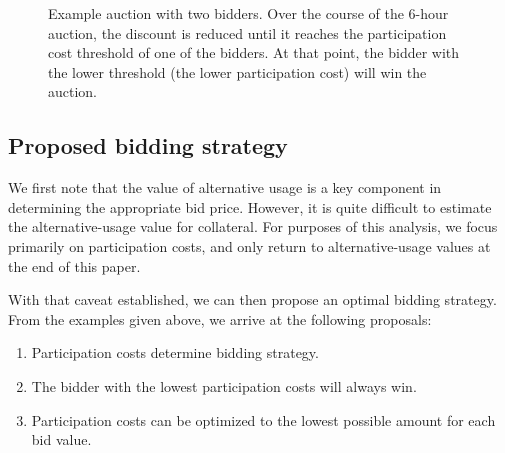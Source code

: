 \documentclass[conference]{IEEEtran}
\begin{document}
\begin{center}
    \begin{figure}[htb]
        \caption{Example auction with two bidders. Over the course of the 6-hour auction, the discount is reduced until it reaches the participation cost threshold of one of the bidders. At that point, the bidder with the lower threshold (the lower participation cost) will win the auction.}
        \label{fig:twoBidders}
    \end{figure}
\end{center}

\subsection{Proposed bidding strategy}
We first note that the value of alternative usage is a key component in determining the appropriate bid price. However, it is quite difficult to estimate the alternative-usage value for collateral. For purposes of this analysis, we focus primarily on participation costs, and only return to alternative-usage values at the end of this paper. 

With that caveat established, we can then propose an optimal bidding strategy. From the examples given above, we arrive at the following proposals:
\begin{enumerate}
    \item Participation costs determine bidding strategy.
    \item The bidder with the lowest participation costs will always win.
    \item Participation costs can be optimized to the lowest possible amount for each bid value.
\end{enumerate}
\end{document}
